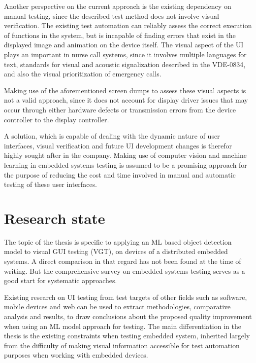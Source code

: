 \documentclass[Proposal,BIC,english,IEEE]{BASE/twbook} %
\begin{document}
Another perspective on the current approach is the existing dependency on manual testing, since the described test method does not involve visual verification. The existing test automation can reliably assess the correct execution of functions in the system, but is incapable of finding errors that exist in the displayed image and animation on the device itself.
The visual aspect of the UI plays an important in nurse call systems, since it involves multiple languages for text, standards for visual and acoustic signalization described in the VDE-0834\autocite{DINVDE08341}, and also the visual prioritization of emergency calls.

Making use of the aforementioned screen dumps to assess these visual aspects is not a valid approach, since it does not account for display driver issues that may occur through either hardware defects or transmission errors from the device controller to the display controller.

A solution, which is capable of dealing with the dynamic nature of user interfaces, visual verification and future UI development changes is therefor highly sought after in the company. Making use of computer vision and machine learning in embedded systems testing is assumed to be a promising approach for the purpose of reducing the cost and time involved in manual and automatic testing of these user interfaces.
\clearpage
\newpage
\chapter{Research state}
The topic of the thesis is specific to applying an ML based object detection model to visual GUI testing (VGT), on devices of a distributed embedded systems. A direct comparison in that regard has not been found at the time of writing. But the comprehensive survey \autocite{garousiTestingEmbeddedSoftware2018} on embedded systems testing serves as a good start for systematic approaches.

Existing research on UI testing from test targets of other fields such as software, mobile devices and web can be used to extract methodologies, comparative analysis and results, to draw conclusions about the proposed quality improvement when using an ML model approach for testing. The main differentiation in the thesis is the existing constraints when testing embedded system, inherited largely from the difficulty of making visual information accessible for test automation purposes when working with embedded devices.
\end{document}
